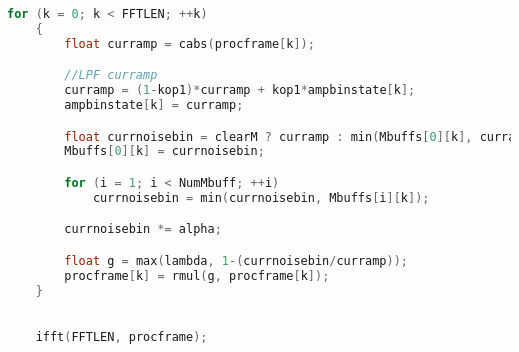 \documentclass[11pt]{article} %
\begin{document}
\begin{center}
\begin{lstlisting}[language = C]
	for (k = 0; k < FFTLEN; ++k)
	{
		float curramp = cabs(procframe[k]); 

		//LPF curramp
		curramp = (1-kop1)*curramp + kop1*ampbinstate[k];
		ampbinstate[k] = curramp;

		float currnoisebin = clearM ? curramp : min(Mbuffs[0][k], curramp);
		Mbuffs[0][k] = currnoisebin;

		for (i = 1; i < NumMbuff; ++i)
			currnoisebin = min(currnoisebin, Mbuffs[i][k]);

		currnoisebin *= alpha;

		float g = max(lambda, 1-(currnoisebin/curramp));
		procframe[k] = rmul(g, procframe[k]);
	}

	
	ifft(FFTLEN, procframe);
    \end{lstlisting}
  \end{center}
\end{document}
